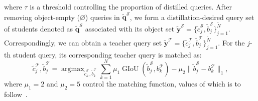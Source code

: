 \documentclass[10pt,twocolumn,letterpaper]{article}
\begin{document}
%
where $\tau$ is a threshold controlling the proportion of distilled queries. After removing object-empty ($\varnothing$) queries in $\tilde{\bm q}^{\mathcal{S}}$, we form a distillation-desired query set of students denoted as $\tilde{{\bm q}}^{\mathcal{S}}$ associated with its object set $\tilde{{\bm y}}^{\mathcal{S}} =  \{\tilde{c}^{\mathcal{S}}_j, \tilde{b}^{\mathcal{S}}_j\}_{j=1}^{\tilde{N}}$. Correspondingly, we can obtain a teacher query set $\tilde{{\bm y}}^{\mathcal{T}} =  \{\tilde{c}^{\mathcal{T}}_j, \tilde{b}^{\mathcal{T}}_j\}_{j=1}^{\tilde{N}}$. For the $j$-th student query, its corresponding teacher query is matched as:
%
\begin{equation}
\tilde{c}^{\mathcal{T}}_j, \tilde{b}^{\mathcal{T}}_j = \mathop{\arg \max}_{\tilde{c}^{\mathcal{T}}_k, \tilde{b}^{\mathcal{T}}_k}\sum^{N}_{k=1} \mu_1 \operatorname{GIoU}(\tilde{b}^{\mathcal{S}}_{j}, b^{\mathcal{T}}_{k})-\mu_2\|\tilde{b}^{\mathcal{S}}_{j} - b^{\mathcal{T}}_{k}\|_1, 
\end{equation}
%
where $\mu_1=2$ and $\mu_2=5$ control the matching function, values of which is to follow~\cite{carion2020end}.
\end{document}

